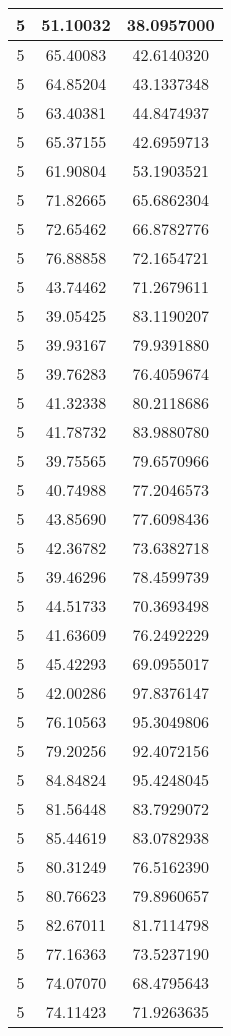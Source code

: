 \documentclass[
]{book}
\begin{document}
\begin{tabular}{c|c|c}
\hline
5 & 51.10032 & 38.0957000\\
\hline
5 & 65.40083 & 42.6140320\\
\hline
5 & 64.85204 & 43.1337348\\
\hline
5 & 63.40381 & 44.8474937\\
\hline
5 & 65.37155 & 42.6959713\\
\hline
5 & 61.90804 & 53.1903521\\
\hline
5 & 71.82665 & 65.6862304\\
\hline
5 & 72.65462 & 66.8782776\\
\hline
5 & 76.88858 & 72.1654721\\
\hline
5 & 43.74462 & 71.2679611\\
\hline
5 & 39.05425 & 83.1190207\\
\hline
5 & 39.93167 & 79.9391880\\
\hline
5 & 39.76283 & 76.4059674\\
\hline
5 & 41.32338 & 80.2118686\\
\hline
5 & 41.78732 & 83.9880780\\
\hline
5 & 39.75565 & 79.6570966\\
\hline
5 & 40.74988 & 77.2046573\\
\hline
5 & 43.85690 & 77.6098436\\
\hline
5 & 42.36782 & 73.6382718\\
\hline
5 & 39.46296 & 78.4599739\\
\hline
5 & 44.51733 & 70.3693498\\
\hline
5 & 41.63609 & 76.2492229\\
\hline
5 & 45.42293 & 69.0955017\\
\hline
5 & 42.00286 & 97.8376147\\
\hline
5 & 76.10563 & 95.3049806\\
\hline
5 & 79.20256 & 92.4072156\\
\hline
5 & 84.84824 & 95.4248045\\
\hline
5 & 81.56448 & 83.7929072\\
\hline
5 & 85.44619 & 83.0782938\\
\hline
5 & 80.31249 & 76.5162390\\
\hline
5 & 80.76623 & 79.8960657\\
\hline
5 & 82.67011 & 81.7114798\\
\hline
5 & 77.16363 & 73.5237190\\
\hline
5 & 74.07070 & 68.4795643\\
\hline
5 & 74.11423 & 71.9263635\\

\end{tabular}
\end{document}
